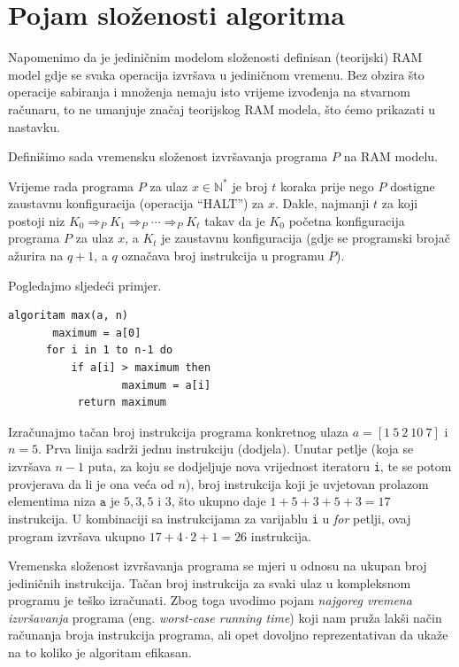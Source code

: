 \section{Pojam složenosti algoritma}

Napomenimo da je jediničnim modelom složenosti definisan (teorijski) RAM model gdje se svaka operacija izvršava u jediničnom vremenu.  Bez obzira što operacije sabiranja i množenja nemaju isto vrijeme izvođenja na stvarnom računaru, to ne umanjuje značaj teorijskog RAM modela, što ćemo prikazati u nastavku.   

Definišimo sada vremensku složenost izvršavanja programa $P$ na RAM modelu.

\begin{definition}
	Vrijeme rada programa $P$ za ulaz  $x \in \mathbb{N}^*$ je broj $t$ koraka prije nego $P$ dostigne zaustavnu
	konfiguracija (operacija ``HALT'') za $x$. Dakle, najmanji $t$ za koji postoji niz $K_0 \Rightarrow_P  K_1 \Rightarrow_P \cdots \Rightarrow_P K_t$ takav da je $K_0$
	početna konfiguracija programa $P$ za ulaz $x$, a $K_t$ je zaustavnu konfiguracija (gdje se programski brojač  ažurira na $q + 1$, a $q$
	označava broj instrukcija u programu $P$).  	
\end{definition}
 
 	Pogledajmo sljedeći primjer. 
	
\begin{verbatim}
algoritam max(a, n)
	   maximum = a[0]
 	  for i in 1 to n-1 do
	      if a[i] > maximum then
                  maximum = a[i]
           return maximum    
\end{verbatim}


Izračunajmo tačan broj instrukcija programa konkretnog ulaza $a = [1\ 5\ 2\ 10\ 7]$ i $n = 5$. Prva linija  sadrži jednu instrukciju (dodjela). Unutar petlje (koja se izvršava $n-1$ puta, za koju se dodjeljuje nova  vrijednost iteratoru \texttt{i}, te se potom provjerava da li je ona veća od $n$), broj instrukcija koji je uvjetovan prolazom elementima niza  $\texttt{a}$ je $5, 3, 5$ i $3$, što ukupno daje $1+5+3+5+3=17$ instrukcija.  U kombinaciji sa instrukcijama za varijablu \texttt{i} u \emph{for} petlji, ovaj program izvršava ukupno $17+ 4 \cdot 2 + 1 = 26$ instrukcija.



Vremenska složenost izvršavanja programa se mjeri u odnosu na ukupan broj
jediničnih instrukcija. Tačan broj instrukcija za svaki ulaz u kompleksnom programu je     teško  izračunati. Zbog toga uvodimo pojam \textit{najgoreg vremena izvršavanja} programa (eng. \textit{worst-case running time}) koji nam pruža   lakši način računanja broja instrukcija programa, ali opet dovoljno reprezentativan da ukaže na to koliko je algoritam efikasan. 

